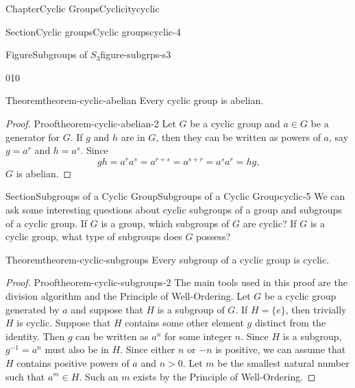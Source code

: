 \documentclass[oneside,10pt,]{book}
\numberwithin{equation}{section}
\newcommand{\identity}{\mathrm{id}}
\newcommand{\gt}{>}
\begin{document}
\begin{chapterptx}{Chapter}{Cyclic Groups}{}{Cyclicity}{}{}{cyclic}
\begin{sectionptx}{Section}{Cyclic groups}{}{Cyclic groups}{}{}{cyclic-4}
\begin{figureptx}{Figure}{Subgroups of \(S_3\)}{figure-subgrps-s3}{}
\begin{image}{0}{1}{0}{}
{%
}%
\end{image}%
\tcblower
\end{figureptx}%
\begin{theorem}{Theorem}{}{}{theorem-cyclic-abelian}%
Every cyclic group is abelian.%
\end{theorem}
\begin{proof}{Proof}{}{theorem-cyclic-abelian-2}
Let \(G\) be a cyclic group and \(a \in G\) be a generator for \(G\). If \(g\) and \(h\) are in \(G\), then they can be written as powers of \(a\), say \(g = a^r\) and \(h = a^s\). Since%
\begin{equation*}
g  h = a^r a^s = a^{r+s} = a^{s+r} = a^s a^r = h g\text{,}
\end{equation*}
\(G\) is abelian.%
\end{proof}
\end{sectionptx}
%
%
\typeout{************************************************}
\typeout{************************************************}
%
\begin{sectionptx}{Section}{Subgroups of a Cyclic Group}{}{Subgroups of a Cyclic Group}{}{}{cyclic-5}
We can ask some interesting questions about cyclic subgroups of a group and subgroups of a cyclic group.  If \(G\) is a group, which subgroups of \(G\) are cyclic? If \(G\) is a cyclic group, what type of subgroups does \(G\) possess?%
\begin{theorem}{Theorem}{}{}{theorem-cyclic-subgroups}%
Every subgroup of a cyclic group is cyclic.%
\end{theorem}
\begin{proof}{Proof}{}{theorem-cyclic-subgroups-2}
The main tools used in this proof are the division algorithm and the Principle of Well-Ordering. Let \(G\) be a cyclic group generated by \(a\) and suppose that \(H\) is a subgroup of \(G\). If \(H = \{ e \}\), then trivially \(H\) is cyclic. Suppose that \(H\) contains some other element \(g\) distinct from the identity. Then \(g\) can be written as \(a^n\) for some integer \(n\). Since \(H\) is a subgroup, \(g^{-1} = a^{n}\) must also be in \(H\).  Since either \(n\) or \(-n\) is positive, we can assume that \(H\) contains positive powers of \(a\) and \(n \gt 0\). Let \(m\) be the smallest natural number such that \(a^m \in H\). Such an \(m\) exists by the Principle of Well-Ordering.%

\end{proof}
\end{sectionptx}
\end{chapterptx}
\end{document}
